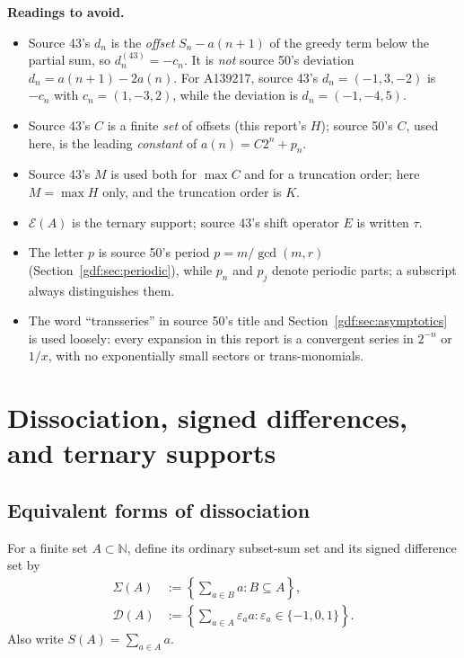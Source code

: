 \documentclass[11pt,a4paper]{article}
\numberwithin{equation}{section}
\theoremstyle{definition}
\theoremstyle{remark}
\theoremstyle{plain}
\newcommand{\N}{\mathbb N}
\newcommand{\cD}{\mathcal D}
\newcommand{\cE}{\mathcal E}
\begin{document}
\noindent\textbf{Readings to avoid.}
\begin{itemize}
\item Source 43's $d_n$ is the \emph{offset} $S_n-a(n+1)$ of the greedy term
      below the partial sum, so $d_n^{(43)}=-c_n$.  It is \emph{not} source
      50's deviation $d_n=a(n+1)-2a(n)$.  For A139217, source 43's
      $d_n=(-1,3,-2)$ is $-c_n$ with $c_n=(1,-3,2)$, while the deviation is
      $d_n=(-1,-4,5)$.
\item Source 43's $C$ is a finite \emph{set} of offsets (this report's
      $H$); source 50's $C$, used here, is the leading \emph{constant} of
      $a(n)=C2^n+p_n$.
\item Source 43's $M$ is used both for $\max C$ and for a truncation order;
      here $M=\max H$ only, and the truncation order is $K$.
\item $\cE(A)$ is the ternary support; source 43's shift operator $E$ is
      written $\tau$.
\item The letter $p$ is source 50's period $p=m/\gcd(m,r)$
      (Section~\ref{gdf:sec:periodic}), while $p_n$ and $p_j$ denote periodic
      parts; a subscript always distinguishes them.
\item The word ``transseries'' in source 50's title and Section~\ref{gdf:sec:asymptotics}
      is used loosely: every expansion in this report is a convergent series
      in $2^{-n}$ or $1/x$, with no exponentially small sectors or
      trans-monomials.
\end{itemize}

\section{Dissociation, signed differences, and ternary supports}\label{gdf:sec:dissociation}

\subsection{Equivalent forms of dissociation}

For a finite set $A\subset\N$, define its ordinary subset-sum set and its
signed difference set by
\begin{align}
 \Sigma(A)&:=\left\{\sum_{a\in B}a:B\subseteq A\right\},\label{gdf:eq:sigma}\\
 \cD(A)&:=\left\{\sum_{a\in A}\varepsilon_a a:
                    \varepsilon_a\in\{-1,0,1\}\right\}.
 \label{gdf:eq:D-def}
\end{align}
Also write $S(A)=\sum_{a\in A}a$.
\end{document}
